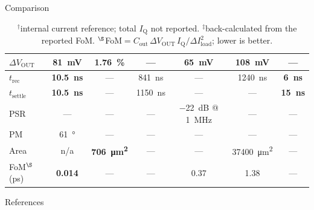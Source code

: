 \documentclass[aspectratio=169, t, 9pt]{beamer} %
\begin{document}
\begin{frame}{Comparison}
\begin{table}[t]
\begin{tabular}{@{}l|c|c|c|c|c|c@{}}
\hline
$\Delta V_\text{OUT}$ & \SI{81}{\milli\volt} & \SI{1.76}{\percent} & --- & \SI{65}{\milli\volt} & \SI{108}{\milli\volt} & --- \\
\hline
$t_\text{rec}$ & \textbf{\SI{10.5}{\nano\second}} & --- & \SI{841}{\nano\second} & --- & \SI{1240}{\nano\second} & \textbf{\SI{6}{\nano\second}} \\
\hline
$t_\text{settle}$ & \textbf{\SI{10.5}{\nano\second}} & --- & \SI{1150}{\nano\second} & --- & --- & \textbf{\SI{15}{\nano\second}} \\
\hline
PSR & --- & --- & --- & \SI{-22}{\deci\bel} @ \SI{1}{\mega\hertz} & --- & --- \\
\hline
PM & \SI{61}{\degree} & --- & --- & --- & --- & --- \\
\hline
Area & n/a & \textbf{\SI{706}{\micro\meter\squared}} & --- & --- & \SI{37400}{\micro\meter\squared} & --- \\
\hline
FoM$^{\S}$ (\si{\pico\second}) & \textbf{0.014} & --- & --- & 0.37 & 1.38 & --- \\
\end{tabular}
\caption{$^{\dagger}$internal current reference; total $I_\text{Q}$ not reported. $^{\ddagger}$back-calculated from the reported FoM. $^{\S}$FoM${}=C_\text{out}\,\Delta V_\text{OUT}\,I_\text{Q}/\Delta I_\text{load}^{2}$; lower is better.}
\label{tab:ldo-comparison}
\end{table}
\end{frame}





\begin{frame}[allowframebreaks]{References}
    \printbibliography
\end{frame}
\end{document}
